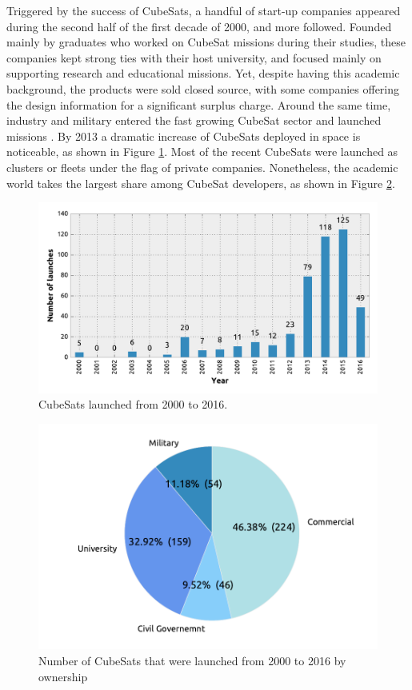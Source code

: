 Triggered by the success of CubeSats, a handful of start-up companies appeared during the second half of the first decade of 2000, and more followed. Founded mainly by graduates who worked on CubeSat missions during their studies, these companies kept strong ties with their host university, and focused mainly on supporting research and educational missions. Yet, despite having this academic background, the products were sold closed source, with some companies offering the design information for a significant surplus charge. Around the same time, industry and military entered the fast growing CubeSat sector and launched missions \cite{taraba2009boeing}. By 2013 a dramatic increase of CubeSats deployed in space is noticeable, as shown in Figure \ref{fig:CubeSats_launched_from_2000_to_2016}. Most of the recent CubeSats were launched as clusters or fleets under the flag of private companies. Nonetheless, the academic world takes the largest share among CubeSat developers, as shown in Figure \ref{fig:CubeSats_2000_2016_by_ownership}. 

\begin{figure}[h]
\centering\includegraphics[width=0.8\linewidth]{fig/cubesats_launched_from_2000_to_2016}
\caption{CubeSats launched from 2000 to 2016. \cite{swartwout}}
\label{fig:CubeSats_launched_from_2000_to_2016}
\end{figure}

\begin{figure}[h]
\centering\includegraphics[width=0.65\linewidth]{fig/cubesats_launched_from_2000_to_2016_by_ownership}
\caption{Number of CubeSats that were launched from 2000 to 2016 by ownership \cite{swartwout}}
\label{fig:CubeSats_2000_2016_by_ownership}
\end{figure}

